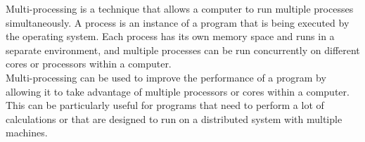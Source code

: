 \documentclass[11pt]{article}
\begin{document}
Multi-processing is a technique that allows a computer to run multiple processes simultaneously. A process is an instance of a program that is being executed by the operating system. Each process has its own memory space and runs in a separate environment, and multiple processes can be run concurrently on different cores or processors within a computer.\\

Multi-processing can be used to improve the performance of a program by allowing it to take advantage of multiple processors or cores within a computer. 
This can be particularly useful for programs that need to perform a lot of calculations or that are designed to run on a distributed system with multiple machines.\\











\end{document}
